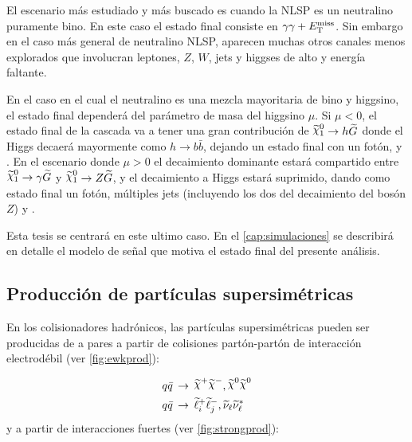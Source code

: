 El escenario más estudiado y más buscado es cuando la NLSP es un neutralino
puramente bino. En este caso el estado final consiste en $\gamma\gamma + E_{\mathrm{T}}^{\mathrm{miss}}$. Sin
embargo en el caso más general de neutralino NLSP, aparecen muchas otros canales
menos explorados que involucran leptones, $Z$, $W$, jets y higgses de alto {\pt}
y energía faltante.


En el caso en el cual el neutralino es una mezcla mayoritaria de bino y
higgsino, el estado final dependerá del parámetro de masa del higgsino $\mu$. Si
$\mu <0$, el estado final de la cascada va a tener una gran contribución de
$\ninoone \to h\gravino$ donde el Higgs decaerá mayormente como $h\to b
\bar{b}$, dejando un estado final con un fotón, {\bjets} y {\met}. En el
escenario donde $\mu>0$ el decaimiento dominante estará compartido entre
$\ninoone \to \gam\gravino$ y $\ninoone\to Z \gravino$, y el decaimiento a Higgs
estará suprimido, dando como estado final un fotón, múltiples jets (incluyendo
los dos del decaimiento del bosón $Z$) y {\met}.

Esta tesis se centrará en este ultimo caso. En el \cref{cap:simulaciones}
se describirá en detalle el modelo de se\~nal que motiva el estado final
del presente análisis.



\subsection{Producción de partículas supersimétricas}

En los colisionadores hadrónicos, las partículas supersimétricas pueden ser
producidas de a pares a partir de colisiones partón-partón de interacción
electrodébil (ver \cref{fig:ewkprod}):

\begin{align}
  &q\bar{q} \, \to \, \chinop \chinom, \nino \nino \label{eq:qq_ewk} \\
  &q\bar{q} \, \to \, \susy{\ell}^{+}_{i}\susy{\ell}^{-}_{j}, \susy{\nu}_{\ell}\susy{\nu}^{*}_{\ell} \label{eq:qq_ewk2}
\end{align}
%
y a partir de interacciones fuertes (ver \cref{fig:strongprod}):


